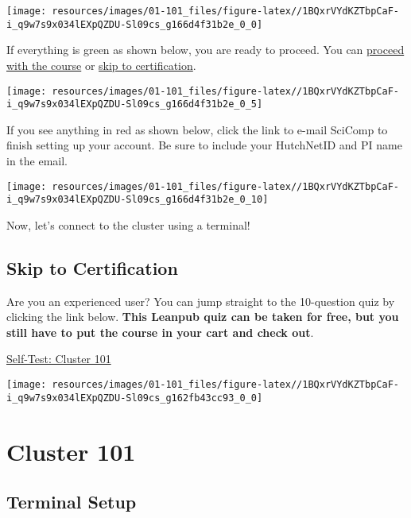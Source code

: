 \documentclass[
]{book}
\begin{document}
\texttt{[image: resources/images/01-101\_files/figure-latex//1BQxrVYdKZTbpCaF-i\_q9w7s9x034lEXpQZDU-Sl09cs\_g166d4f31b2e\_0\_0]}

If everything is green as shown below, you are ready to proceed. You can \protect\hyperlink{terminal}{proceed with the course} or \protect\hyperlink{skip-to-certification}{skip to certification}.

\texttt{[image: resources/images/01-101\_files/figure-latex//1BQxrVYdKZTbpCaF-i\_q9w7s9x034lEXpQZDU-Sl09cs\_g166d4f31b2e\_0\_5]}

If you see anything in red as shown below, click the link to e-mail SciComp to finish setting up your account. Be sure to include your HutchNetID and PI name in the email.

\texttt{[image: resources/images/01-101\_files/figure-latex//1BQxrVYdKZTbpCaF-i\_q9w7s9x034lEXpQZDU-Sl09cs\_g166d4f31b2e\_0\_10]}

Now, let's connect to the cluster using a terminal!

\hypertarget{skip-to-certification}{%
\chapter*{Skip to Certification}\label{skip-to-certification}}

Are you an experienced user? You can jump straight to the 10-question quiz by clicking the link below. \textbf{This Leanpub quiz can be taken for free, but you still have to put the course in your cart and check out}.

\href{https://leanpub.com/courses/fredhutch/fredhutchcluster101/quizzes/self_test_101}{Self-Test: Cluster 101}

\texttt{[image: resources/images/01-101\_files/figure-latex//1BQxrVYdKZTbpCaF-i\_q9w7s9x034lEXpQZDU-Sl09cs\_g162fb43cc93\_0\_0]}

\hypertarget{part-cluster-101}{%
\part*{Cluster 101}\label{part-cluster-101}}

\hypertarget{terminal}{%
\chapter{Terminal Setup}\label{terminal}}
\end{document}
